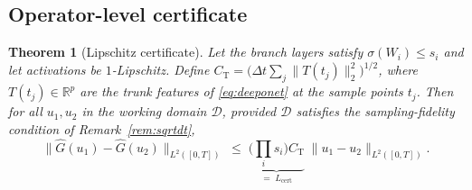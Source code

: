 \documentclass[11pt]{article}
\newtheorem{theorem}{Theorem}
\newcommand{\Ltwo}{L^2}
\newcommand{\Ghat}{\hat{G}}
\newcommand{\Lhat}{L_{\mathrm{cert}}}
\begin{document}
\subsection{Operator-level certificate}
\begin{theorem}[Lipschitz certificate]\label{thm:cert}
Let the branch layers satisfy $\sigma(W_i)\le s_i$ and let activations be
$1$-Lipschitz. Define
$C_{\mathrm{T}}=\big(\Delta t\sum_{j}\|T(t_j)\|_2^2\big)^{1/2}$, where
$T(t_j)\in\mathbb{R}^p$ are the trunk features of \eqref{eq:deeponet} at
the sample points $t_j$.
Then for all $u_1,u_2$ in the working domain $\mathcal{D}$, provided
$\mathcal{D}$ satisfies the sampling-fidelity condition of
Remark~\ref{rem:sqrtdt},
\begin{equation}
  \|\Ghat(u_1)-\Ghat(u_2)\|_{\Ltwo([0,T])}
  \;\le\; \underbrace{\Big(\prod_i s_i\Big) C_{\mathrm{T}}}_{=\;\Lhat}\;
  \|u_1-u_2\|_{\Ltwo([0,T])}.
\end{equation}
\end{theorem}
\end{document}
